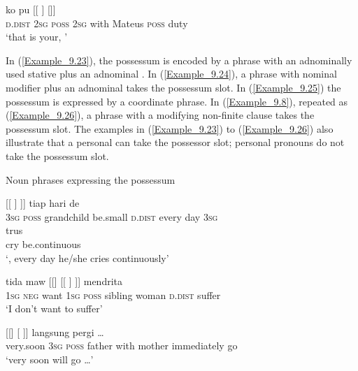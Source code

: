 \ea
\label{Example_9.22}
 {ko} {pu} {[[} {} {]} {} {[]]}\\ %
 \textsc{d.dist}  \textsc{2sg}  \textsc{poss}  \textsc{2sg}  with  Mateus  \textsc{poss}  duty\\
\glt 
‘that is your, ’ \textstyleExampleSource{[081005-001-Cv.0035]}
\z


In (\ref{Example_9.23}), the possessum is encoded by a  phrase with an adnominally used stative  plus an adnominal . In (\ref{Example_9.24}), a  phrase with nominal modifier plus an adnominal  takes the possessum slot. In (\ref{Example_9.25}) the possessum is expressed by a coordinate  phrase. In (\ref{Example_9.8}), repeated as (\ref{Example_9.26}), a  phrase with a modifying non-finite clause takes the possessum slot. The examples in (\ref{Example_9.23}) to (\ref{Example_9.26}) also illustrate that a personal  can take the possessor slot; personal pronouns do not take the possessum slot.



\begin{styleExampleTitle}
Noun phrases expressing the possessum
\end{styleExampleTitle}
\ea
\label{Example_9.23}
\gll {[[\bluebold{de}]} {{}} {[[} {]} {]]} {tiap} {hari} {de}\\ %
 \textsc{3sg}  {\textsc{poss}}  grandchild  be.small  \textsc{d.dist}  every  day  \textsc{3sg}\\
  {trus}\\
 {cry}  {be.continuous}\\
\glt 
‘, every day he/she cries continuously’ \textstyleExampleSource{[081011-009-Cv.0055]}
\z

\ea
\label{Example_9.24}
 {tida} {maw} {[[]} {} {[[} {]} {]]} {mendrita}\\ %
 \textsc{1sg}  \textsc{neg}  want  \textsc{1sg}  \textsc{poss}  sibling  woman  \textsc{d.dist}  suffer\\
\glt 
‘I don’t want  to suffer’ \textstyleExampleSource{[081006-024-CvEx.0108]}
\z

\ea
\label{Example_9.25}
 {[[]} {} {[} {} {]]} {langsung} {pergi} {\ldots}\\ %
 very.soon  \textsc{3sg}  \textsc{poss}  father  with  mother  immediately  go  \\
\glt 
‘very soon  will go {\ldots}’ \textstyleExampleSource{[081110-005-CvPr.0079]}
\z

